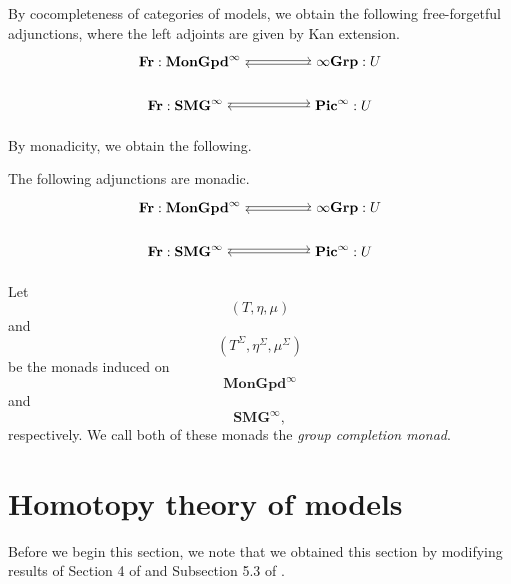 \documentclass{tac}
\begin{document}
By cocompleteness of categories of models, we obtain the following free-forgetful adjunctions, where the left adjoints are given by Kan extension.
\[
\begin{tikzpicture}[node distance=4cm]
	\node (A) {$\mathbf{Fr}:\mathbf{MonGpd}^{\infty}$};
	\node (B)[right of=A]{$\infty\mathbf{Grp}:U$};
	\draw[transform canvas={yshift=0.3ex},->] (A) to node {} (B);
	\draw[transform canvas={yshift=-0.3ex},->,swap] (B) to node {} (A);
\end{tikzpicture}
\]

\[
\begin{tikzpicture}[node distance=4cm]
	\node (A) {$\mathbf{Fr}:\mathbf{SMG}^{\infty}$};
	\node (B)[right of=A]{$\mathbf{Pic}^{\infty}:U$};
	\draw[transform canvas={yshift=0.3ex},->] (A) to node {} (B);
	\draw[transform canvas={yshift=-0.3ex},->,swap] (B) to node {} (A);
\end{tikzpicture}
\]

By monadicity, we obtain the following.

\begin{lemma}
The following adjunctions are monadic.
\[
\begin{tikzpicture}[node distance=4cm]
	\node (A) {$\mathbf{Fr}:\mathbf{MonGpd}^{\infty}$};
	\node (B)[right of=A]{$\infty\mathbf{Grp}:U$};
	\draw[transform canvas={yshift=0.3ex},->] (A) to node {} (B);
	\draw[transform canvas={yshift=-0.3ex},->,swap] (B) to node {} (A);
\end{tikzpicture}
\]

\[
\begin{tikzpicture}[node distance=4cm]
	\node (A) {$\mathbf{Fr}:\mathbf{SMG}^{\infty}$};
	\node (B)[right of=A]{$\mathbf{Pic}^{\infty}:U$};
	\draw[transform canvas={yshift=0.3ex},->] (A) to node {} (B);
	\draw[transform canvas={yshift=-0.3ex},->,swap] (B) to node {} (A);
\end{tikzpicture}
\]
\end{lemma}

\begin{definition}
Let
\[
(T,\eta,\mu)
\]
and
\[
(T^\Sigma,\eta^\Sigma,\mu^\Sigma)
\]
be the monads induced on
\[
\mathbf{MonGpd}^\infty
\]
and
\[
\mathbf{SMG}^\infty,
\]
respectively. We call both of these monads the \emph{group completion monad}.
\end{definition}

\section{Homotopy theory of models}
Before we begin this section, we note that we obtained this section by modifying results of Section 4 of \cite{Dim1} and Subsection 5.3 of \cite{Henry2016}.
\end{document}
